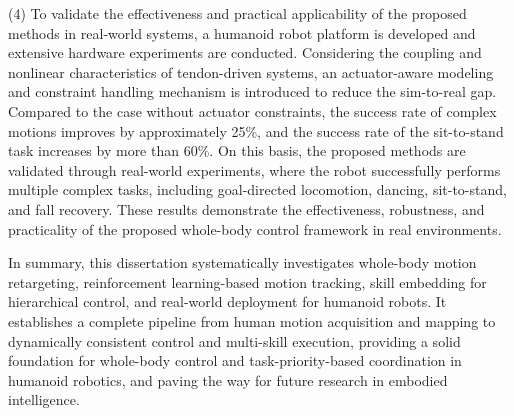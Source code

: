 \begin{eabstract}
	(4) To validate the effectiveness and practical applicability of the proposed methods in real-world systems, a humanoid robot platform is developed and extensive hardware experiments are conducted. Considering the coupling and nonlinear characteristics of tendon-driven systems, an actuator-aware modeling and constraint handling mechanism is introduced to reduce the sim-to-real gap. Compared to the case without actuator constraints, the success rate of complex motions improves by approximately 25\%, and the success rate of the sit-to-stand task increases by more than 60\%. On this basis, the proposed methods are validated through real-world experiments, where the robot successfully performs multiple complex tasks, including goal-directed locomotion, dancing, sit-to-stand, and fall recovery. These results demonstrate the effectiveness, robustness, and practicality of the proposed whole-body control framework in real environments.
	
	In summary, this dissertation systematically investigates whole-body motion retargeting, reinforcement learning-based motion tracking, skill embedding for hierarchical control, and real-world deployment for humanoid robots. It establishes a complete pipeline from human motion acquisition and mapping to dynamically consistent control and multi-skill execution, providing a solid foundation for whole-body control and task-priority-based coordination in humanoid robotics, and paving the way for future research in embodied intelligence.
	
\end{eabstract}
